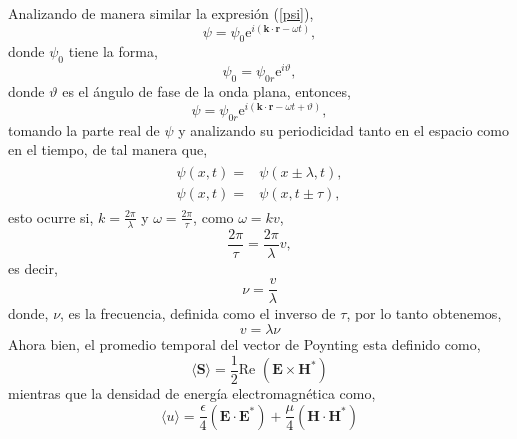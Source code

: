 \documentclass[11pt,fleqn]{book} %
\begin{document}
Analizando de manera similar la expresi\'on (\ref{psi}),
\begin{equation*}
\psi=\psi_0\text{e}^{i(\textbf{k}\cdot\textbf{r}-\omega t)},
\end{equation*}
donde $\psi_0$ tiene la forma,
\begin{equation*}
\psi_0=\psi_{0r}\text{e}^{i\vartheta},
\end{equation*}
donde $\vartheta$ es el \'angulo de fase de la onda plana, entonces,
\begin{equation*}
\psi=\psi_{0r}\text{e}^{i(\textbf{k}\cdot\textbf{r}-\omega t+\vartheta)},
\end{equation*}
tomando la parte real de $\psi$ y analizando su periodicidad tanto en el espacio como en el tiempo, de tal manera que,
\begin{eqnarray*}
\begin{split}
\psi(x,t)=&\psi(x\pm\lambda,t),\\
\psi(x,t)=&\psi(x,t\pm\tau),
\end{split}
\end{eqnarray*}
esto ocurre si, $k=\frac{2\pi}{\lambda}$ y $\omega=\frac{2\pi}{\tau}$, como $\omega=kv$,
\begin{equation*}
\frac{2\pi}{\tau}=\frac{2\pi}{\lambda}v,
\end{equation*}
es decir,
\begin{equation*}
\nu=\frac{v}{\lambda}
\end{equation*}
donde, $\nu$, es la frecuencia, definida como el inverso de $\tau$, por lo tanto obtenemos,
\begin{equation}
v=\lambda\nu
\end{equation}
Ahora bien, el promedio temporal del vector de Poynting esta definido como,
\begin{equation*}
\langle\textbf{S} \rangle=\frac{1}{2}\text{Re  }(\textbf{E}\times \textbf{H}^{*})
\end{equation*}
mientras que la densidad de energ\'ia electromagn\'etica como,
\begin{equation}
\langle u \rangle =\frac{\epsilon}{4}(\textbf{E}\cdot\textbf{E}^{*})+\frac{\mu}{4}(\textbf{H}\cdot\textbf{H}^{*})
\end{equation}
\end{document}
